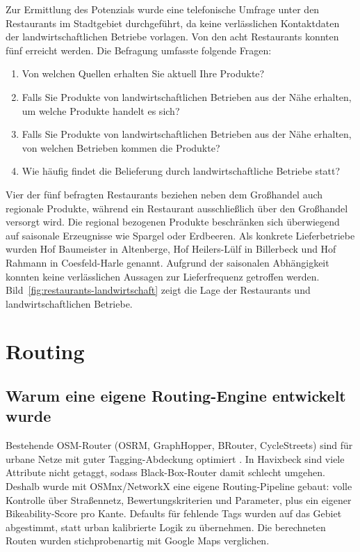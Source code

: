 \documentclass[a4paper,11pt,parskip=half,numbers=noenddot]{scrreprt}
\begin{document}
Zur Ermittlung des Potenzials wurde eine telefonische Umfrage unter den Restaurants im Stadtgebiet durchgeführt, da keine verlässlichen Kontaktdaten der landwirtschaftlichen Betriebe vorlagen. Von den acht Restaurants konnten fünf erreicht werden. Die Befragung umfasste folgende Fragen:

\begin{enumerate}
\item Von welchen Quellen erhalten Sie aktuell Ihre Produkte?
\item Falls Sie Produkte von landwirtschaftlichen Betrieben aus der Nähe erhalten, um welche Produkte handelt es sich?
\item Falls Sie Produkte von landwirtschaftlichen Betrieben aus der Nähe erhalten, von welchen Betrieben kommen die Produkte?
\item Wie häufig findet die Belieferung durch landwirtschaftliche Betriebe statt?
\end{enumerate}

Vier der fünf befragten Restaurants beziehen neben dem Großhandel auch regionale Produkte, während ein Restaurant ausschließlich über den Großhandel versorgt wird. Die regional bezogenen Produkte beschränken sich überwiegend auf saisonale Erzeugnisse wie Spargel oder Erdbeeren. Als konkrete Lieferbetriebe wurden Hof Baumeister in Altenberge, Hof Heilers-Lülf in Billerbeck und Hof Rahmann in Coesfeld-Harle genannt. Aufgrund der saisonalen Abhängigkeit konnten keine verlässlichen Aussagen zur Lieferfrequenz getroffen werden. Bild~\ref{fig:restaurants-landwirtschaft} zeigt die Lage der Restaurants und landwirtschaftlichen Betriebe.

\chapter{Routing}
\label{ch:routing}

\section{Warum eine eigene Routing-Engine entwickelt wurde}

Bestehende OSM-Router (OSRM, GraphHopper, BRouter, CycleStreets) sind für urbane Netze mit guter Tagging-Abdeckung optimiert \parencite{Luxen2011,GraphHopper,Brenschede,CycleStreets}. In Havixbeck sind viele Attribute nicht getaggt, sodass Black-Box-Router damit schlecht umgehen. Deshalb wurde mit OSMnx/NetworkX eine eigene Routing-Pipeline gebaut: volle Kontrolle über Straßennetz, Bewertungskriterien und Parameter, plus ein eigener Bikeability-Score pro Kante. Defaults für fehlende Tags wurden auf das Gebiet abgestimmt, statt urban kalibrierte Logik zu übernehmen. Die berechneten Routen wurden stichprobenartig mit Google Maps verglichen.
\end{document}
